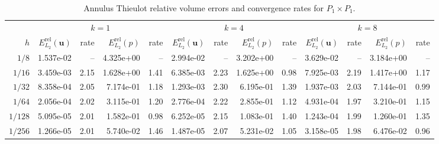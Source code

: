 \documentclass[10pt,a4paper]{article}
\begin{document}
\begin{table}[p]
\centering
\caption{Annulus Thieulot relative volume errors and convergence rates for $P_1\times P_1$.}
\label{tab:annulus_thieulot_v1_p1_cont}
\small
\begin{tabular}{
r rr rr rr rr rr rr
}
\toprule
& \multicolumn{4}{c}{$k=1$} & \multicolumn{4}{c}{$k=4$} & \multicolumn{4}{c}{$k=8$} \\
\cmidrule(lr){2-5}\cmidrule(lr){6-9}\cmidrule(lr){10-13}
$h$ & $E_{L_2}^{\mathrm{rel}}(\mathbf{u})$ & rate & $E_{L_2}^{\mathrm{rel}}(p)$ & rate & $E_{L_2}^{\mathrm{rel}}(\mathbf{u})$ & rate & $E_{L_2}^{\mathrm{rel}}(p)$ & rate & $E_{L_2}^{\mathrm{rel}}(\mathbf{u})$ & rate & $E_{L_2}^{\mathrm{rel}}(p)$ & rate \\
\midrule
$1/8$ & 1.537e-02 & -- & 4.325e+00 & -- & 2.994e-02 & -- & 3.202e+00 & -- & 3.629e-02 & -- & 3.184e+00 & -- \\
$1/16$ & 3.459e-03 & 2.15 & 1.628e+00 & 1.41 & 6.385e-03 & 2.23 & 1.625e+00 & 0.98 & 7.925e-03 & 2.19 & 1.417e+00 & 1.17 \\
$1/32$ & 8.358e-04 & 2.05 & 7.174e-01 & 1.18 & 1.293e-03 & 2.30 & 6.195e-01 & 1.39 & 1.937e-03 & 2.03 & 7.144e-01 & 0.99 \\
$1/64$ & 2.056e-04 & 2.02 & 3.115e-01 & 1.20 & 2.776e-04 & 2.22 & 2.855e-01 & 1.12 & 4.931e-04 & 1.97 & 3.210e-01 & 1.15 \\
$1/128$ & 5.095e-05 & 2.01 & 1.582e-01 & 0.98 & 6.252e-05 & 2.15 & 1.083e-01 & 1.40 & 1.243e-04 & 1.99 & 1.260e-01 & 1.35 \\
$1/256$ & 1.266e-05 & 2.01 & 5.740e-02 & 1.46 & 1.487e-05 & 2.07 & 5.231e-02 & 1.05 & 3.158e-05 & 1.98 & 6.476e-02 & 0.96 \\
\bottomrule
\end{tabular}
\end{table}
\end{document}

